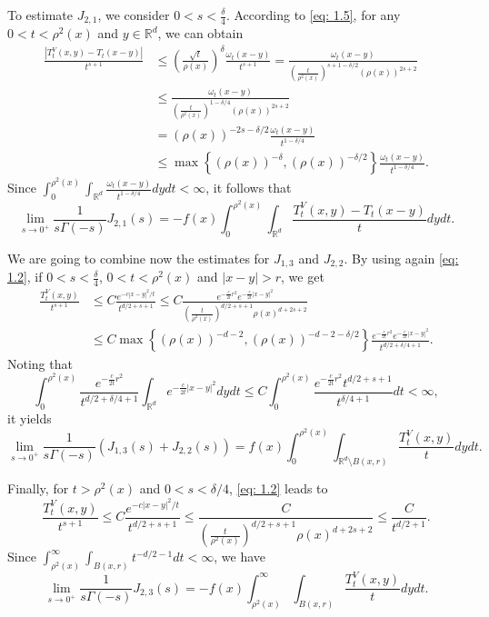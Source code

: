 \documentclass[10pt, a4paper, reqno]{amsart}
\theoremstyle{definition}
\theoremstyle{remark}
\newcommand{\RR}{\mathbb{R}}
\numberwithin{equation}{section}
\begin{document}
To estimate $J_{2,1}$, we consider $0<s<\frac{\delta}{4}$. According to \eqref{eq: 1.5}, for any $0<t<\rho^2(x)$ and $y\in \RR^d$, we can obtain
\begin{align*}
    \frac{|T_t^V(x,y)-T_t(x-y)|}{t^{s+1}}&\leq  \left(\frac{\sqrt{t}}{\rho(x)}\right)^\delta \frac{\omega_t(x-y)}{t^{s+1}} =  \frac{\omega_t(x-y)}{\left(\frac{t}{\rho^2(x)}\right)^{s+1-\delta/2}(\rho(x))^{2s+2}}\\
    &\leq \frac{\omega_t(x-y)}{\left(\frac{t}{\rho^2(x)}\right)^{1-\delta/4}(\rho(x))^{2s+2}}\\
    &= (\rho(x))^{-2s-\delta/2} \frac{\omega_t(x-y)}{t^{1-\delta/4}}\\
    &\leq \max\left\{(\rho(x))^{-\delta}, (\rho(x))^{-\delta/2}\right\} \frac{\omega_t(x-y)}{t^{1-\delta/4}}.
\end{align*}
Since $\int_0^{\rho^2(x)}\int_{\RR^d} \frac{\omega_t(x-y)}{t^{1-\delta/4}} dydt<\infty$, it follows that
\[\lim_{s\to 0^+} \frac{1}{s\Gamma(-s)}J_{2,1}(s)=-f(x)\int_0^{\rho^2(x)}\int_{\RR^d} \frac{T_t^V(x,y)-T_t(x-y)}{t}dydt.\]

We are going to combine now the estimates for $J_{1,3}$ and $J_{2,2}$. By using again \eqref{eq: 1.2}, if $0<s<\frac{\delta}{4}$, $0<t<\rho^2(x)$ and $|x-y|>r$, we get
\begin{align*}
    \frac{T_t^V(x,y)}{t^{s+1}}&\leq C \frac{e^{-c|x-y|^2/t}}{t^{d/2+s+1}}\leq C\frac{e^{-\frac{c}{2t}r^2} e^{-\frac{c}{2t}|x-y|^2}}{\left(\frac{t}{\rho^2(x)}\right)^{d/2+s+1}\rho(x)^{d+2s+2}}\\
    &\leq C \max\left\{(\rho(x))^{-d-2},(\rho(x))^{-d-2-\delta/2}\right\} \frac{e^{-\frac{c}{2t}r^2} e^{-\frac{c}{2t}|x-y|^2}}{t^{d/2+\delta/4+1}}.
\end{align*}
Noting that
\[\int_0^{\rho^2(x)} \frac{e^{-\frac{c}{2t}r^2}}{t^{d/2+\delta/4+1}}\int_{\RR^d} e^{-\frac{c}{2t}|x-y|^2} dydt\leq C \int_0^{\rho^2(x)} \frac{e^{-\frac{c}{2t}r^2}{t^{d/2+s+1}}}{t^{\delta/4+1}}dt<\infty,\]
it yields
\[\lim_{s\to 0^+} \frac{1}{s\Gamma(-s)}\left(J_{1,3}(s)+J_{2,2}(s)\right)=f(x)\int_0^{\rho^2(x)}\int_{\RR^d \setminus B(x,r)} \frac{T_t^V(x,y)}{t}dy dt.\]

Finally, for $t>\rho^2(x)$ and $0<s<\delta/4$, \eqref{eq: 1.2} leads to
\[\frac{T_t^V(x,y)}{t^{s+1}}\leq C \frac{e^{-c|x-y|^2/t}}{t^{d/2+s+1}}\leq \frac{C}{\left(\frac{t}{\rho^2(x)}\right)^{d/2+s+1}\rho(x)^{d+2s+2}}\leq \frac{C}{t^{d/2+1}}.\]
Since $\int_{\rho^2(x)}^\infty \int_{B(x,r)} t^{-d/2-1}dt<\infty$, we have
\[\lim_{s\to 0^+} \frac{1}{s\Gamma(-s)} J_{2,3}(s)=-f(x)\int_{\rho^2(x)}^\infty \int_{B(x,r)}\frac{T_t^V(x,y)}{t} dydt.\]
\end{document}

